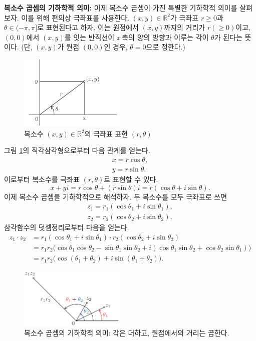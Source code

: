 {\bf  복소수 곱셈의 기하학적 의미: }
이제 복소수 곱셈이 가진 특별한 기하학적 의미를 살펴보자.
이를 위해 편의상 극좌표를 사용한다.
$(x,y)\in\mathbb R^2$가 극좌표 $r\ge 0$과 $\theta\in(-\pi,\pi]$로 표현된다고 하자.
이는 원점에서 $(x,y)$까지의 거리가 $r(\ge0)$이고,
$(0,0)$에서 $(x,y)$를 잇는 반직선이 $x\,$축의 양의 방향과 이루는 각이 $\theta$가 된다는 뜻이다.
(단, $(x,y)$가 원점 $(0,0)$인 경우, $\theta=0$으로 정한다.)

\begin{figure}[!h]
\begin{center}
\includegraphics[width=0.45\textwidth]{./SaltChapter/figs/fig-1-4}
\end{center}
\caption{복소수 $(x,y)\in\mathbb R^2$의 극좌표 표현 $(r, \theta)$}
\label{fig-1-4}
\end{figure}

그림 \ref{fig-1-4}의 직각삼각형으로부터 다음 관계를 얻는다.
\begin{gather*}
x = r \cos\theta, \\
y = r \sin \theta.
\end{gather*}
이로부터 복소수를 극좌표 $(r,\theta)$로 표현할 수 있다.
$$
x + yi = r\cos\theta +(r\sin \theta)i
= r(\cos\theta + i\sin \theta).
$$
이제 복소수 곱셈을 기하학적으로 해석하자.
두 복소수를 모두 극좌표로 쓰면
\begin{gather*}
z_1 = r_1 (\cos\theta_1 + i\sin\theta_1), \\
z_2 = r_2 (\cos\theta_2 + i\sin\theta_2),
\end{gather*}
삼각함수의 덧셈정리로부터 다음을 얻는다.
\begin{align*}
z_1\cdot z_2 &= r_1(\cos\theta_1+i\sin\theta_1) \cdot r_2(\cos\theta_2+i\sin\theta_2) \\
&= r_1r_2 \big(\cos\theta_1\cos\theta_2 - \sin\theta_1\sin\theta_2 +
i(\cos\theta_1\sin\theta_2 + \cos\theta_2\sin\theta_1)\big) \\
&= r_1r_2\big(\cos(\theta_1 +\theta_2) + i \sin(\theta_1 +\theta_2)\big).
\end{align*}

\begin{figure}[!h]
\begin{center}
\includegraphics[width=0.45\textwidth]{./SaltChapter/figs/fig-1-5}
\end{center}
\caption{복소수 곱셈의 기하학적 의미: 각은 더하고, 원점에서의 거리는 곱한다.}
\label{fig-1-5}
\end{figure}

